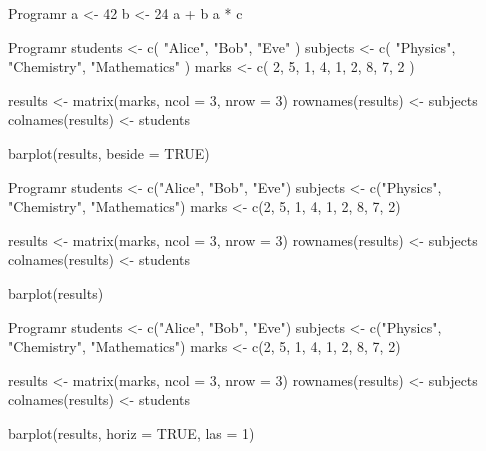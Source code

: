 \graphicspath{{../figures/assignment2/}}

\begin{code}
    {Program}{r}
a <- 42
b <- 24
a + b
a * c
\end{code}

\begin{code}
    {Program}{r}
students <- c(
  "Alice", "Bob", "Eve"
)
subjects <- c(
  "Physics", "Chemistry", "Mathematics"
)
marks <- c(
  2, 5, 1,
  4, 1, 2,
  8, 7, 2
)

results <- matrix(marks, ncol = 3, nrow = 3)
rownames(results) <- subjects
colnames(results) <- students

barplot(results, beside = TRUE)
\end{code}
\newpage
\pagestyle{fancy}

\begin{code}
    {Program}{r}
students <- c("Alice", "Bob", "Eve")
subjects <- c("Physics", "Chemistry", "Mathematics")
marks <- c(2, 5, 1, 4, 1, 2, 8, 7, 2)

results <- matrix(marks, ncol = 3, nrow = 3)
rownames(results) <- subjects
colnames(results) <- students

barplot(results)
\end{code}

\newpage
{}
\begin{code}
    {Program}{r}
students <- c("Alice", "Bob", "Eve")
subjects <- c("Physics", "Chemistry", "Mathematics")
marks <- c(2, 5, 1, 4, 1, 2, 8, 7, 2)

results <- matrix(marks, ncol = 3, nrow = 3)
rownames(results) <- subjects
colnames(results) <- students

barplot(results, horiz = TRUE, las = 1)
\end{code}

